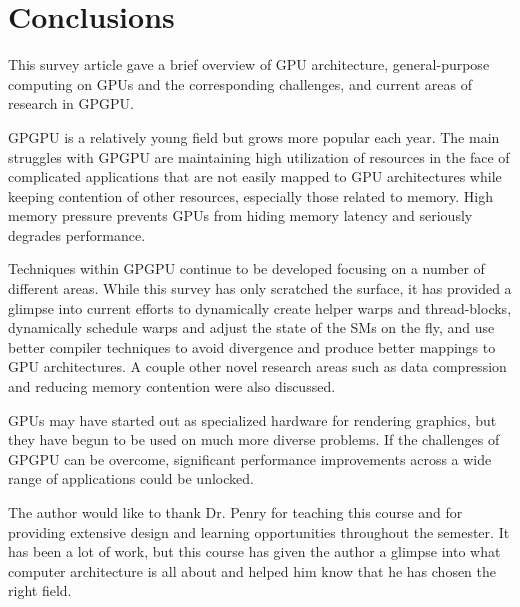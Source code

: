 \documentclass[prodmode,acmtecs]{acmsmall} %
\begin{document}
\section{Conclusions} \label{sec:conclusions}
This survey article gave a brief overview of GPU architecture, general-purpose
computing on GPUs and the corresponding challenges, and current areas of
research in GPGPU.

GPGPU is a relatively young field but grows more popular each year. The main
struggles with GPGPU are maintaining high utilization of resources in the face
of complicated applications that are not easily mapped to GPU architectures
while keeping contention of other resources, especially those related to memory.
High memory pressure prevents GPUs from hiding memory latency and seriously
degrades performance.

Techniques within GPGPU continue to be developed focusing on a number of
different areas. While this survey has only scratched the surface, it has
provided a glimpse into current efforts to dynamically create helper warps and
thread-blocks, dynamically schedule warps and adjust the state of the SMs on the
fly, and use better compiler techniques to avoid divergence and produce better
mappings to GPU architectures. A couple other novel research areas such as data
compression and reducing memory contention were also discussed.

GPUs may have started out as specialized hardware for rendering graphics, but
they have begun to be used on much more diverse problems. If the challenges of
GPGPU can be overcome, significant performance improvements across a wide range
of applications could be unlocked.

\begin{acks}
The author would like to thank Dr. Penry for teaching this course and for
providing extensive design and learning opportunities throughout the semester.
It has been a lot of work, but this course has given the author a glimpse into
what computer architecture is all about and helped him know that he has chosen
the right field.
\end{acks}




\end{document}
